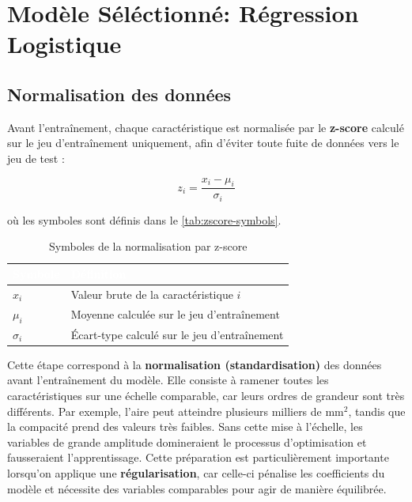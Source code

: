 \section{Modèle Séléctionné: Régression Logistique}
\label{sec:modele-rl}

\subsection{Normalisation des données}
\label{subsec:normalisation}

Avant l'entraînement, chaque caractéristique est normalisée par le \textbf{z-score} calculé sur le jeu d'entraînement uniquement, afin d'éviter toute fuite de données vers le jeu de test :

\begin{equation}
    z_i = \frac{x_i - \mu_i}{\sigma_i}
    \label{eq:zscore}
\end{equation}

où les symboles sont définis dans le \autoref{tab:zscore-symbols}.

\begin{table}[H]
    \centering
    \caption{Symboles de la normalisation par z-score}
    \label{tab:zscore-symbols}
    \begin{tabularx}{\textwidth}{|>{\bfseries\centering\arraybackslash}p{2cm}|X|}
        \hline
        \rowcolor{headerblue}
        \textcolor{white}{\textbf{Symbole}} & \centering\textcolor{white}{\textbf{Définition}} \tabularnewline
        \hline
        \rowcolor{rowlight}
        $x_i$ & Valeur brute de la caractéristique $i$ \\
        \hline
        \rowcolor{rowwhite}
        $\mu_i$ & Moyenne calculée sur le jeu d'entraînement \\
        \hline
        \rowcolor{rowlight}
        $\sigma_i$ & Écart-type calculé sur le jeu d'entraînement \\
        \hline
    \end{tabularx}
\end{table}

Cette étape correspond à la \textbf{normalisation (standardisation)} des données avant l'entraînement du modèle. Elle consiste à ramener toutes les caractéristiques sur une échelle comparable, car leurs ordres de grandeur sont très différents. Par exemple, l’aire peut atteindre plusieurs milliers de mm$^2$, tandis que la compacité prend des valeurs très faibles. Sans cette mise à l’échelle, les variables de grande amplitude domineraient le processus d’optimisation et fausseraient l’apprentissage. Cette préparation est particulièrement importante lorsqu’on applique une \textbf{régularisation}, car celle-ci pénalise les coefficients du modèle et nécessite des variables comparables pour agir de manière équilibrée.

